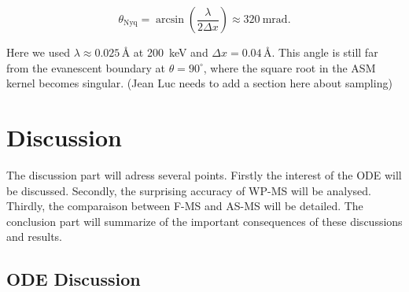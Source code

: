 \documentclass[preprint,12pt,number]{elsarticle}
\begin{document}
\[
\theta_{\mathrm{Nyq}}
= \arcsin\!\left(\frac{\lambda}{2\Delta x}\right)
\approx 320~\mathrm{mrad}.
\]

Here we used $\lambda \approx 0.025\,\text{\AA}$ at 200~keV and
$\Delta x = 0.04\,\text{\AA}$. This angle is still far from the
evanescent boundary at $\theta=90^\circ$, where the square root in the ASM
kernel becomes singular. (Jean Luc needs to add a section here about sampling)

\section{Discussion}
\label{sec:discussion}

The discussion part will adress several points. Firstly the interest of the ODE will be discussed. Secondly, the surprising accuracy of WP-MS will be analysed. Thirdly, the comparaison between F-MS and AS-MS will be detailed. The conclusion part will summarize of the important consequences of these discussions and results. 

\subsection{ODE Discussion}
\label{sec:ODEdiscussion}
\end{document}
